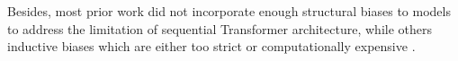 \documentclass[11pt]{article}
\newcommand{\su}[1]{{\color{blue} SU: #1}}
\begin{document}
Besides, most prior work \cite{chen2019tabfact, yin20acl} did not incorporate enough structural biases to models to address the limitation of sequential Transformer architecture, while others inductive biases which are either too strict \cite{zhang2020table, eisenschlos2021mate} or computationally expensive \cite{yin20acl}.

\end{document}
